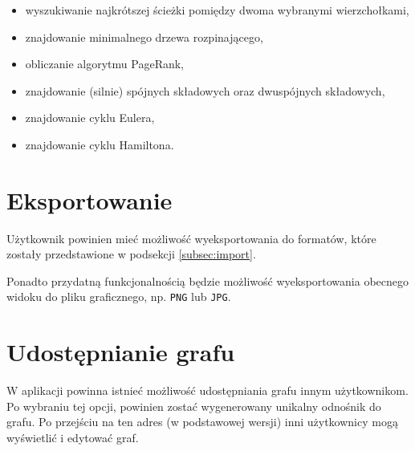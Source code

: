 \begin{itemize}
\setlength\itemsep{0em}
\item wyszukiwanie najkrótszej ścieżki pomiędzy dwoma wybranymi wierzchołkami,
\item znajdowanie minimalnego drzewa rozpinającego,
\item obliczanie algorytmu PageRank,
\item znajdowanie (silnie) spójnych składowych oraz dwuspójnych składowych,
\item znajdowanie cyklu Eulera,
\item znajdowanie cyklu Hamiltona.
\end{itemize}

\section{Eksportowanie}
Użytkownik powinien mieć możliwość wyeksportowania do formatów, które zostały przedstawione w podsekcji \ref{subsec:import}. 

Ponadto przydatną funkcjonalnością będzie możliwość wyeksportowania obecnego widoku do pliku graficznego, np. \texttt{PNG} lub \texttt{JPG}. 

\section{Udostępnianie grafu}
W aplikacji powinna istnieć możliwość udostępniania grafu innym użytkownikom. Po wybraniu tej opcji, powinien zostać wygenerowany unikalny odnośnik do grafu. Po przejściu na ten adres (w podstawowej wersji) inni użytkownicy mogą wyświetlić i edytować graf.
